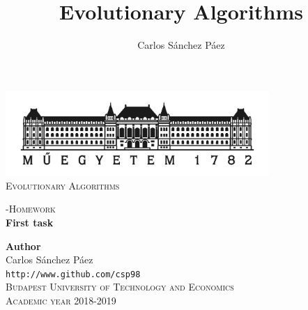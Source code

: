 \documentclass[12pt,english]{article}
\title{Evolutionary Algorithms}
\author{Carlos Sánchez Páez}
\begin{document}
\begin{titlepage}

\newlength{\centeroffset}
\setlength{\centeroffset}{-0.5\oddsidemargin}
\addtolength{\centeroffset}{0.5\evensidemargin}
\thispagestyle{empty}

\noindent\hspace*{\centeroffset}
\begin{minipage}{\textwidth}

\centering
\includegraphics[width=0.75\textwidth]{bme_logo.jpg}\\[1.4cm]

\textsc{ \Large Evolutionary Algorithms\\[4cm]}

-\textsc{\Huge Homework}\\[0.75cm]

{\Large\bfseries First task\\}
\end{minipage}

\vspace{8cm}
\noindent\hspace*{\centeroffset}
\begin{minipage}{\textwidth}
\centering

\textbf{Author}\\ {Carlos Sánchez Páez}\\
\texttt{http://www.github.com/csp98}\\[0.5cm]
\textsc{Budapest University of Technology and Economics}\\
\vspace{1cm}
\textsc{Academic year 2018-2019}
\end{minipage}
\end{titlepage}
\thispagestyle{empty}

\newpage
\end{document}
